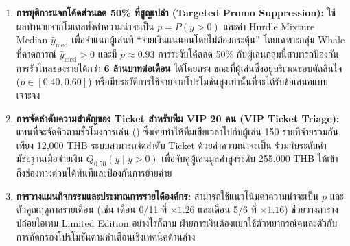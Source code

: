 \begin{enumerate}
    \item \textbf{การยุติการแจกโค้ดส่วนลด 50\% ที่สูญเปล่า (Targeted Promo Suppression):} ใช้ผลทำนายจากโมเดลทั้งค่าความน่าจะเป็น $p = P(y > 0)$ และค่า Hurdle Mixture Median $\hat{y}_{\text{med}}$ เพื่อจำแนกผู้เล่นที่ ``จ่ายเงินแน่นอนโดยไม่ต้องกระตุ้น'' โดยเฉพาะกลุ่ม Whale ที่คาดการณ์ $\hat{y}_{\text{med}} > 0$ และมี $p \approx 0.93$ การระงับโค้ดลด 50\% กับผู้เล่นกลุ่มนี้สามารถป้องกันการรั่วไหลของรายได้กว่า \textbf{6 ล้านบาทต่อเดือน} ได้โดยตรง ขณะที่ผู้เล่นซึ่งอยู่บริเวณขอบตัดสินใจ ($p \in [0.40, 0.60]$) หรือมีประวัติการใช้จ่ายจากโปรโมชันสูงเท่านั้นที่จะได้รับข้อเสนอแบบเจาะจง
    \item \textbf{การจัดลำดับความสำคัญของ Ticket สำหรับทีม VIP 20 คน (VIP Ticket Triage):} แทนที่จะจัดคิวตามชั่วโมงการเล่น () ซึ่งเคยทำให้ทีมเสียเวลาไปกับผู้เล่น 150 รายที่จ่ายรวมกันเพียง 12,000 THB ระบบสามารถจัดลำดับ Ticket ด้วยค่าความน่าจะเป็น  ร่วมกับระดับค่ามัธยฐานเมื่อจ่ายเงิน $Q_{0.50}(y \mid y > 0)$ เพื่อจับคู่ผู้เล่นมูลค่าสูงระดับ 255,000 THB ให้เข้าถึงช่องทางด่วนได้ทันทีและป้องกันการย้ายค่าย
    \item \textbf{การวางแผนกิจกรรมและประมาณการรายได้องค์กร:} สามารถใช้แนวโน้มค่าความน่าจะเป็น $p$ และตัวคูณฤดูกาลรายเดือน (เช่น เดือน 0/11 ที่ $\times 1.26$ และเดือน 5/6 ที่ $\times 1.16$) ช่วยวางตารางปล่อยไอเทม Limited Edition อย่างไรก็ตาม ฝ่ายการเงินต้องแยกใช้ตัวพยากรณ์คนละตัวกับการคัดกรองโปรโมชันตามคำเตือนเชิงเทคนิคด้านล่าง
\end{enumerate}

